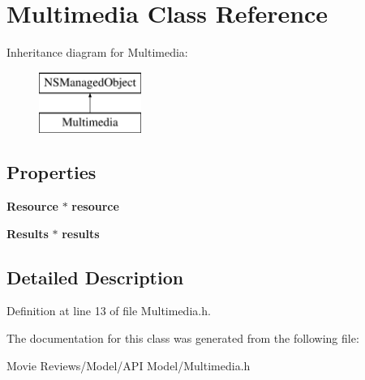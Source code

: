 \section{Multimedia Class Reference}
\label{interface_multimedia}
Inheritance diagram for Multimedia\+:\begin{figure}[H]
\begin{center}
\leavevmode
\includegraphics[height=2.000000cm]{interface_multimedia}
\end{center}
\end{figure}
\subsection*{Properties}
\begin{DoxyCompactItemize}
\item 
{\bf Resource} $\ast$ {\bfseries resource}\label{interface_multimedia_a0be3335927990223471ac84df38a165e}

\item 
{\bf Results} $\ast$ {\bfseries results}\label{interface_multimedia_ab7d1fae523dfb17bc053d0f0de320e39}

\end{DoxyCompactItemize}


\subsection{Detailed Description}


Definition at line 13 of file Multimedia.\+h.



The documentation for this class was generated from the following file\+:\begin{DoxyCompactItemize}
\item 
Movie Reviews/\+Model/\+A\+P\+I Model/Multimedia.\+h\end{DoxyCompactItemize}
